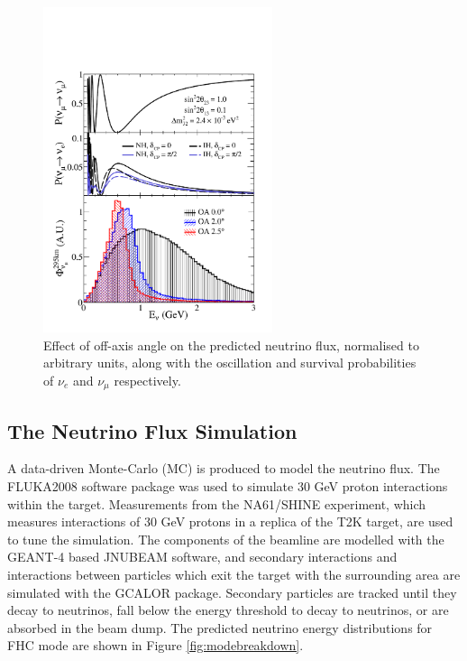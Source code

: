 \begin{figure}[!htbp]
\centering
\includegraphics*[width=0.6\textwidth,clip]{figs/oaeffect_pnue_pnumu_flux}
\caption{Effect of off-axis angle on the predicted neutrino flux, normalised to arbitrary units, along with the oscillation and survival probabilities of $\nu_{e}$ and $\nu_{\mu}$ respectively.} \label{offaxis}
\end{figure}

\subsection{The Neutrino Flux Simulation}\label{sec:fluxsim}

A data-driven Monte-Carlo (MC) is produced to model the neutrino flux. The FLUKA2008\cite{fluka} software package was used to simulate 30 GeV proton interactions within the target. Measurements from the NA61/SHINE\cite{na61} experiment, which measures interactions of 30 GeV protons in a replica of the T2K target, are used to tune the simulation. The components of the beamline are modelled with the GEANT-4\cite{geant4} based JNUBEAM\cite{jnubeam} software, and secondary interactions and interactions between particles which exit the target with the surrounding area are simulated with the GCALOR package\cite{gcalor}. Secondary particles are tracked until they decay to neutrinos, fall below the energy threshold to decay to neutrinos, or are absorbed in the beam dump. The predicted neutrino energy distributions for FHC mode are shown in Figure \ref{fig:modebreakdown}.

